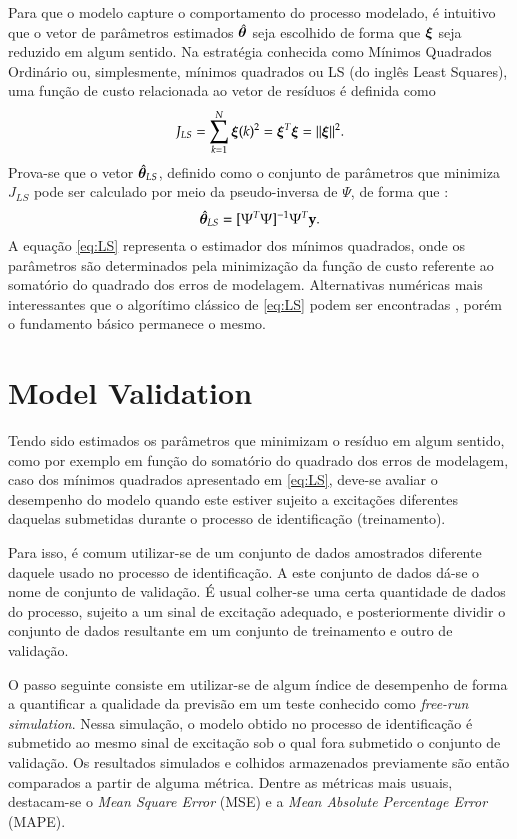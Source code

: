 Para que o modelo capture o comportamento do processo modelado, é intuitivo que o vetor de parâmetros estimados $\hat{\bm{\theta}}$ seja escolhido de forma que $\bm{\xi}$ seja reduzido em algum sentido. Na estratégia conhecida como Mínimos Quadrados Ordinário ou, simplesmente, mínimos quadrados ou LS (do inglês Least Squares), uma função de custo relacionada ao vetor de resíduos é definida como
\begin{equation}
\label{eq:JLS}
   J_{LS} = \sum_{k=1}^{N} \bm{\xi}(k)^2 = \bm{\xi}^T\bm{\xi} = ||\bm{\xi}||^2.
\end{equation}
Prova-se que o vetor $\hat{\bm{\theta}}_{LS}$, definido como o conjunto de parâmetros que minimiza $J_{LS}$ pode ser calculado por meio da pseudo-inversa de $\Psi$, de forma que \citep{aguirre2015}:
\begin{equation}
\label{eq:LS}
   \hat{\bm{\theta}}_{LS} = [\Psi^T \Psi]^{-1}\Psi^T \mathrm{\mathbf{y}}.
\end{equation}
A equação \eqref{eq:LS} representa o estimador dos mínimos quadrados, onde os parâmetros são determinados pela minimização da função de custo referente ao somatório do quadrado dos erros de modelagem.
Alternativas numéricas mais interessantes que o algorítimo clássico de \eqref{eq:LS} podem ser encontradas \citep{aguirre2015,ljung1999}, porém o fundamento básico permanece o mesmo.



\section{Model Validation}\label{sec:model_validation}

Tendo sido estimados os parâmetros que minimizam o resíduo em algum sentido, como por exemplo em função do somatório do quadrado dos erros de modelagem, caso dos mínimos quadrados apresentado em \eqref{eq:LS}, deve-se avaliar o desempenho do modelo quando este estiver sujeito a excitações diferentes daquelas submetidas durante o processo de identificação (treinamento). 

Para  isso, é comum utilizar-se de um conjunto de dados amostrados diferente daquele usado no processo de identificação. A este conjunto de dados dá-se o nome de conjunto de validação. É usual colher-se uma certa quantidade de dados do processo, sujeito a um sinal de excitação adequado, e posteriormente dividir o conjunto de dados resultante em um conjunto de treinamento e outro de validação.

O passo seguinte consiste em utilizar-se de algum índice de desempenho de forma a quantificar a qualidade da previsão em um teste conhecido como \textit{free-run simulation}. Nessa simulação, o modelo obtido no processo de identificação é submetido ao mesmo sinal de excitação sob o qual fora submetido o conjunto de validação. Os resultados simulados e colhidos armazenados previamente são então comparados a partir de alguma métrica. Dentre as métricas mais usuais, destacam-se o \textit{Mean Square Error} (MSE) e a \textit{Mean Absolute Percentage Error} (MAPE).

